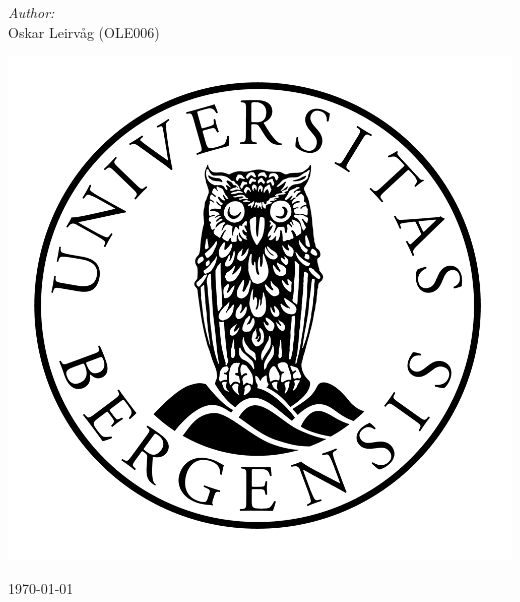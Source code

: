 \begin{titlepage}
    \Large \emph{Author:}\\
    Oskar Leirvåg (OLE006)
    \\[2cm] %
    \centerline{\includegraphics[scale=0.15]{figures/canvas}} %

    {\large \today}\\[3cm] %


    \vfill

\end{titlepage}